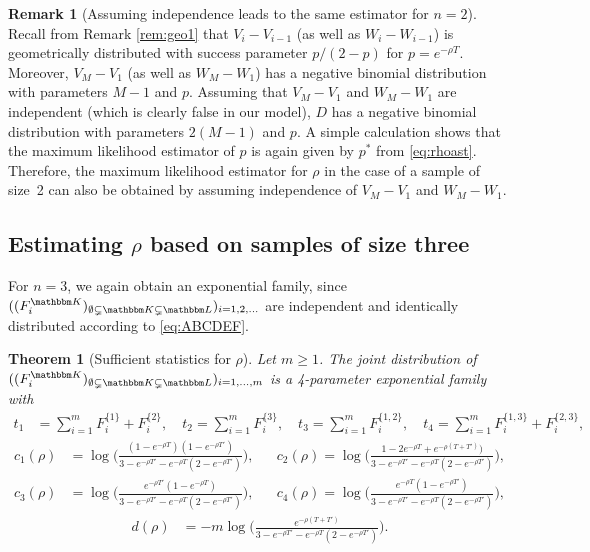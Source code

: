 \documentclass[preprint,authoryear]{elsarticle}
\newtheorem{theorem}{Theorem}
\theoremstyle{definition}
\newtheorem{remark}[proposition]{Remark}
\numberwithin{equation}{section}
\numberwithin{figure}{section}
\begin{document}
\begin{remark}[Assuming independence leads to the same estimator for
  $n=2$\label{rem:98}]
  Recall from Remark \ref{rem:geo1} that $V_i-V_{i-1}$ (as well as
  $W_i-W_{i-1}$) is geometrically distributed with success parameter
  $p/(2-p)$ for $p=e^{-\rho T}$. Moreover, $V_M-V_1$ (as well
  as $W_M-W_1$) has a negative binomial distribution with parameters
  $M-1$ and $p$. Assuming that $V_M-V_1$ and $W_M-W_1$ are independent
  (which is clearly false in our model), $D$ has a negative binomial
  distribution with parameters $2(M-1)$ and $p$. A simple calculation
  shows that the maximum likelihood estimator of $p$ is again given by
  $p^\ast$ from \eqref{eq:rhoast}. Therefore, the maximum likelihood
  estimator for $\rho$ in the case of a sample of size~2 can also be
  obtained by assuming independence of $V_M-V_1$ and $W_M-W_1$.
\end{remark}

\subsection{Estimating $\rho$ based on samples of size three}
\noindent
For $n=3$, we again obtain an exponential family, since
$((F_i^{\mathbbm K})_{\emptyset \subsetneq \mathbbm K\subsetneq
  \mathbbm L})_{i=1,2,...}$
are independent and identically distributed according to
\eqref{eq:ABCDEF}.


\begin{theorem}[Sufficient statistics for $\rho$\label{T:suff2}]
  Let $m\geq 1$. The joint distribution of
  $((F_i^{\mathbbm K})_{\emptyset \subsetneq \mathbbm K\subsetneq
    \mathbbm L})_{i=1,...,m}$ is a 4-parameter exponential family with
  \begin{align*}
    t_1 &= \sum_{i=1}^m F_i^{\{\mathfrak 1\}} + F_i^{\{\mathfrak 2\}},\quad
    t_2 = \sum_{i=1}^m F_i^{\{\mathfrak 3\}},\quad
    t_3 = \sum_{i=1}^m F_i^{\{\mathfrak 1, \mathfrak 2\}},\quad
    t_4 = \sum_{i=1}^m F_i^{\{\mathfrak 1, \mathfrak 3\}} + F_i^{\{\mathfrak 2, \mathfrak 3\}},
  \end{align*}
  \begin{align*}
    c_1(\rho) & = \log\Big(\frac{(1-e^{-\rho T})(1-e^{-\rho T'})}{3 - e^{-\rho T'} - 
                e^{-\rho T}(2-e^{-\rho T'})}\Big), 
    && 
       c_2(\rho)  = \log\Big(\frac{1-2e^{-\rho T} + e^{-\rho (T+T')})}{3 - e^{-\rho T'} - 
       e^{-\rho T}(2-e^{-\rho T'})}\Big), \\
    c_3(\rho) & = \log\Big(\frac{e^{-\rho T'}(1- e^{-\rho T})}{3 - e^{-\rho T'} - 
                e^{-\rho T}(2-e^{-\rho T'})}\Big),
    &&
       c_4(\rho)  = \log\Big(\frac{e^{-\rho T}(1- e^{-\rho T'})}{3 - e^{-\rho T'} - 
       e^{-\rho T}(2-e^{-\rho T'})}\Big),
  \end{align*}
  \begin{align*}
    d(\rho) & = -m \log\Big(\frac{e^{-\rho (T+T')}}{3 - e^{-\rho T'} - e^{-\rho T}(2-e^{-\rho T'})}\Big).
  \end{align*}
\end{theorem}
\end{document}
